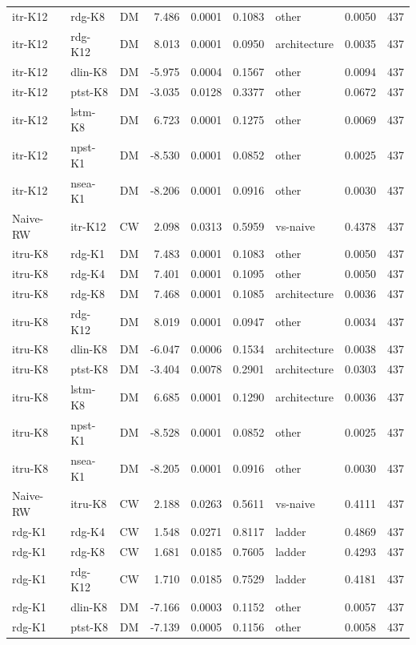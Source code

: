 \begin{table}[!t]
\begin{tabular}{llcrrrlrr}
itr-K12 & rdg-K8 & DM & 7.486 & 0.0001 & 0.1083 & other & 0.0050 & 437 \\
itr-K12 & rdg-K12 & DM & 8.013 & 0.0001 & 0.0950 & architecture & 0.0035 & 437 \\
itr-K12 & dlin-K8 & DM & -5.975 & 0.0004 & 0.1567 & other & 0.0094 & 437 \\
itr-K12 & ptst-K8 & DM & -3.035 & 0.0128 & 0.3377 & other & 0.0672 & 437 \\
itr-K12 & lstm-K8 & DM & 6.723 & 0.0001 & 0.1275 & other & 0.0069 & 437 \\
itr-K12 & npst-K1 & DM & -8.530 & 0.0001 & 0.0852 & other & 0.0025 & 437 \\
itr-K12 & nsea-K1 & DM & -8.206 & 0.0001 & 0.0916 & other & 0.0030 & 437 \\
Naive-RW & itr-K12 & CW & 2.098 & 0.0313 & 0.5959 & vs-naive & 0.4378 & 437 \\
itru-K8 & rdg-K1 & DM & 7.483 & 0.0001 & 0.1083 & other & 0.0050 & 437 \\
itru-K8 & rdg-K4 & DM & 7.401 & 0.0001 & 0.1095 & other & 0.0050 & 437 \\
itru-K8 & rdg-K8 & DM & 7.468 & 0.0001 & 0.1085 & architecture & 0.0036 & 437 \\
itru-K8 & rdg-K12 & DM & 8.019 & 0.0001 & 0.0947 & other & 0.0034 & 437 \\
itru-K8 & dlin-K8 & DM & -6.047 & 0.0006 & 0.1534 & architecture & 0.0038 & 437 \\
itru-K8 & ptst-K8 & DM & -3.404 & 0.0078 & 0.2901 & architecture & 0.0303 & 437 \\
itru-K8 & lstm-K8 & DM & 6.685 & 0.0001 & 0.1290 & architecture & 0.0036 & 437 \\
itru-K8 & npst-K1 & DM & -8.528 & 0.0001 & 0.0852 & other & 0.0025 & 437 \\
itru-K8 & nsea-K1 & DM & -8.205 & 0.0001 & 0.0916 & other & 0.0030 & 437 \\
Naive-RW & itru-K8 & CW & 2.188 & 0.0263 & 0.5611 & vs-naive & 0.4111 & 437 \\
rdg-K1 & rdg-K4 & CW & 1.548 & 0.0271 & 0.8117 & ladder & 0.4869 & 437 \\
rdg-K1 & rdg-K8 & CW & 1.681 & 0.0185 & 0.7605 & ladder & 0.4293 & 437 \\
rdg-K1 & rdg-K12 & CW & 1.710 & 0.0185 & 0.7529 & ladder & 0.4181 & 437 \\
rdg-K1 & dlin-K8 & DM & -7.166 & 0.0003 & 0.1152 & other & 0.0057 & 437 \\
rdg-K1 & ptst-K8 & DM & -7.139 & 0.0005 & 0.1156 & other & 0.0058 & 437 \\

\end{tabular}
\end{table}
